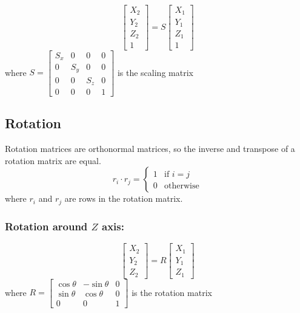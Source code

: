 \documentclass{article}
\begin{document}
\[\begin{bmatrix}
    X_2 \\ Y_2 \\ Z_2 \\ 1
\end{bmatrix} = S \begin{bmatrix}
    X_1 \\ Y_1 \\ Z_1 \\ 1
\end{bmatrix}\] where $S=\begin{bmatrix}
    S_x & 0 & 0 & 0 \\
    0 & S_y & 0 & 0 \\
    0 & 0 & S_z & 0 \\
    0 & 0 & 0 & 1
\end{bmatrix}$ is the scaling matrix

\subsection*{Rotation}
Rotation matrices are orthonormal matrices, so the inverse and transpose of a rotation matrix are
equal.
\[r_i \cdot r_j = \begin{cases}
    1 & \text{if } i = j \\
    0 & \text{otherwise}
\end{cases}\] where $r_i$ and $r_j$ are rows in the rotation matrix.

\vspace{1em}

\subsubsection*{Rotation around $Z$ axis:}
\[\begin{bmatrix}
    X_2 \\ Y_2 \\ Z_2
\end{bmatrix} = R \begin{bmatrix}
    X_1 \\ Y_1 \\ Z_1
\end{bmatrix}\] where $R=\begin{bmatrix}
    \cos\theta & -\sin\theta & 0 \\
    \sin\theta & \cos\theta & 0 \\
    0 & 0 & 1
\end{bmatrix}$ is the rotation matrix
\end{document}

